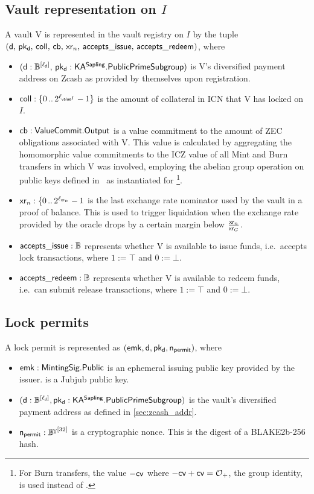 \subsection{Vault representation on \texorpdfstring{$I$}{I}}
A vault V is represented in the vault registry on $I$ by the tuple $(\mathsf{d},\, \mathsf{pk_d},\, \mathsf{coll},\, \mathsf{cb},\, \mathsf{xr}_n,\, \mathsf{accepts\_issue},\, \mathsf{accepts\_redeem})$, where
\begin{itemize}
    \item $(\mathsf{d} : \mathbb{B}^{[\ell_{\mathsf{d}}]},\, \mathsf{pk_d} : \mathsf{KA^{Sapling}}.\mathsf{PublicPrimeSubgroup})$ is V's diversified payment address on Zcash as provided by themselves upon registration.
    \item $\mathsf{coll} : \{0\,..\,2^{\ell_{\mathsf{value}^I}}-1\}$ is the amount of collateral in ICN that V has locked on $I$.
    \item $\mathsf{cb} : \mathsf{ValueCommit}.\mathsf{Output}$ is a value commitment to the amount of ZEC obligations associated with V.
    This value is calculated by aggregating the homomorphic value commitments to the ICZ value of all Mint and Burn transfers in which V was involved, employing the abelian group operation on public keys defined in~\cite[Section 4.1.6.2]{hopwood2016zcash} as instantiated for \redjj\footnote{For Burn transfers, the value $-\mathsf{cv}$ where $-\mathsf{cv} + \mathsf{cv} = \mathcal{O}_+$, the group identity, is used instead of \cv.}.
    \item $\mathsf{xr}_n : \{0\,..\,2^{\ell_{\mathsf{xr}_n}}-1$ is the last exchange rate nominator used by the vault in a proof of balance.
    This is used to trigger liquidation when the exchange rate provided by the oracle drops by a certain margin below $\frac{\mathsf{xr}_n}{\mathsf{xr}_G}$.
    \item $\mathsf{accepts\_issue} : \mathbb{B}$ represents whether V is available to issue funds, i.e.\ accepts lock transactions, where $1 := \top$ and $0 := \bot$.
    \item $\mathsf{accepts\_redeem} : \mathbb{B}$ represents whether V is available to redeem funds, i.e.\ can submit release transactions, where $1 := \top$ and $0 := \bot$.
\end{itemize}

\subsection{Lock permits}
A lock permit is represented as $(\mathsf{emk}, \mathsf{d}, \mathsf{pk_d}, \mathsf{n_{permit}})$, where
\begin{itemize}
    \item $\mathsf{emk} : \mathsf{MintingSig}.\mathsf{Public}$ is an ephemeral issuing public key provided by the issuer.
    \emk is a Jubjub public key.

    \item $(\mathsf{d} : \mathbb{B}^{[\ell_{\mathsf{d}}]}, \mathsf{pk_d} : \mathsf{KA^{Sapling}}.\mathsf{PublicPrimeSubgroup})$ is the vault's diversified payment address as defined in \cref{sec:zcash_addr}.
    
    \item $\nlock : \By^{[32]}$ is a cryptographic nonce.
    This is the digest of a BLAKE2b-256 hash.
\end{itemize}

